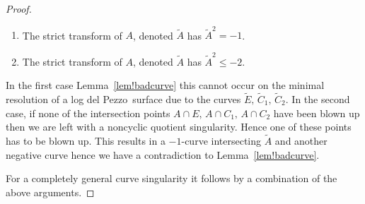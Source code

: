 \documentclass[11pt]{amsbook}
\theoremstyle{plain}
\newcommand{\ldp}{log del Pezzo}
\newcommand{\wt}[1]{\widetilde #1}
\begin{document}
\begin{proof}
\begin{enumerate}
\item
The strict transform of $A$, denoted $\widetilde{A}$ has $\wt{A}^2 = -1$.
\item
The strict transform of $A$, denoted $\widetilde{A}$ has $\wt{A}^2 \leq -2$.
\end{enumerate}

In the first case Lemma~\ref{lem!badcurve} this cannot occur on the minimal resolution of a \ldp\ surface due to the curves $\wt{E}, \, \wt{C_1},\, \wt{C_2}$. In the second case, if none of the intersection points $A\cap E, \, A \cap C_1, \, A \cap C_2$ have been blown up then we are left with a noncyclic quotient singularity. Hence one of these points has to be blown up. This results in a $-1$-curve intersecting $\wt{A}$ and another negative curve hence we have a contradiction to Lemma~\ref{lem!badcurve}.


For a completely general curve singularity it follows by a combination of the above arguments. 
\end{proof}
\end{document}
